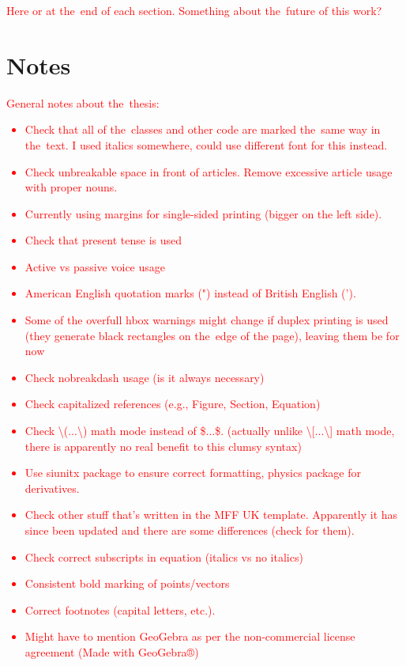 	\textcolor{red}{Here or at the~end of each section. Something about the~future of this work?}
	
	\section*{Notes}
		\textcolor{red}{General notes about the~thesis:
			\begin{itemize}[topsep=4pt,itemsep=2pt]
				\item Check that all of the~classes and other code are marked the~same way in the~text. I used italics somewhere, could use different font for this instead.
				\item Check unbreakable space in front of articles. Remove excessive article usage with proper nouns.
				\item Currently using margins for single-sided printing (bigger on the left side).
				\item Check that present tense is used
				\item Active vs passive voice usage
				\item American English quotation marks (") instead of British English (').
				\item Some of the overfull hbox warnings might change if duplex printing is used (they generate black rectangles on the~edge of the page), leaving them be for now
				\item Check nobreakdash usage (is it always necessary)
				\item Check capitalized references (e.g., Figure, Section, Equation)
				\item Check \textbackslash(...\textbackslash) math mode instead of \$...\$. (actually unlike \textbackslash[...\textbackslash] math mode, there is apparently no real benefit to this clumsy syntax)
				\item Use siunitx package to ensure correct formatting, physics package for derivatives.
				\item Check other stuff that's written in the MFF UK template. Apparently it has since been updated and there are some differences (check for them).
				\item Check correct subscripts in equation (italics vs no italics)
				\item Consistent bold marking of points/vectors
				\item Correct footnotes (capital letters, etc.).
				\item Might have to mention GeoGebra as per the non-commercial license agreement (Made with GeoGebra®)

\end{itemize}}
